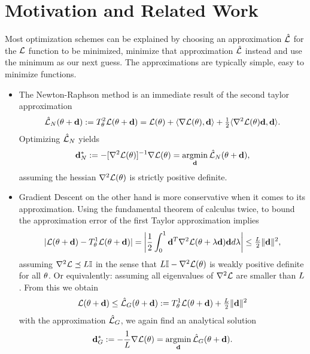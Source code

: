 \section{Motivation and Related Work}

Most optimization schemes can be explained by choosing an approximation 
\(\hat{\mathcal{L}}\) for the \(\mathcal{L}\) function to be minimized, minimize that
approximation \(\hat{\mathcal{L}}\) instead and use the minimum as our next guess.
The approximations are typically simple, easy to minimize functions.

\begin{itemize}
	\item 
	The Newton-Raphson method is an immediate result of the second taylor approximation
	\begin{equation*}
		\hat{\mathcal{L}}_{N}(\theta + \mathbf{d})
		:= T^2_\theta \mathcal{L}(\theta + \mathbf{d})
		= \mathcal{L}(\theta)
		+ \langle \nabla\mathcal{L}(\theta), \mathbf{d}\rangle
		+ \tfrac12 \langle \nabla^2\mathcal{L}(\theta) \mathbf{d}, \mathbf{d}\rangle.
	\end{equation*}
	Optimizing \(\hat{\mathcal{L}}_{N}\) yields
	\begin{equation*}
		\mathbf{d}^*_{N} := -[\nabla^2\mathcal{L}(\theta)]^{-1}\nabla\mathcal{L}(\theta)
		= \operatorname*{argmin}_{\mathbf{d}} \hat{\mathcal{L}}_{N}(\theta + \mathbf{d}),
	\end{equation*}
	assuming the hessian \(\nabla^2\mathcal{L}(\theta)\) is strictly positive definite.

	\item
	Gradient Descent on the other hand is more conservative when it comes to its
	approximation. Using the fundamental theorem of calculus twice, to bound
	the approximation error of the first Taylor approximation implies 
	\begin{equation}\label{eq: T1 error}
		|\mathcal{L}(\theta+\mathbf{d}) - T^1_\theta \mathcal{L}(\theta+\mathbf{d})|
		= \left| \frac 12 \int_0^1 \mathbf{d}^T \nabla^2\mathcal{L}(\theta + \lambda \mathbf{d})\mathbf{d} d\lambda\right|
		\le \tfrac{L}2 \|\mathbf{d}\|^2,
	\end{equation}
	assuming \(\nabla^2\mathcal{L} \preceq L\mathbb{I}\) in the sense that \(L\mathbb{I}
	- \nabla^2\mathcal{L}(\theta)\) is weakly positive definite for all \(\theta\). Or
	equivalently: assuming all eigenvalues of \(\nabla^2\mathcal{L}\) are smaller than
	\(L\). From this we obtain
	\begin{equation*}
		\mathcal{L}(\theta + \mathbf{d}) \le \hat{\mathcal{L}}_G(\theta+\mathbf{d})
		:= T^1_\theta \mathcal{L}(\theta+\mathbf{d}) + \tfrac{L}2\|\mathbf{d}\|^2
	\end{equation*}
	with the approximation \(\hat{\mathcal{L}}_{G}\), we again find an analytical
	solution
	\begin{equation*}
		\mathbf{d}^*_{G} := - \frac1{L} \nabla\mathcal{L}(\theta)
		= \operatorname*{argmin}_{\mathbf{d}} \hat{\mathcal{L}}_{G}(\theta + \mathbf{d}).
	\end{equation*}
\end{itemize}

